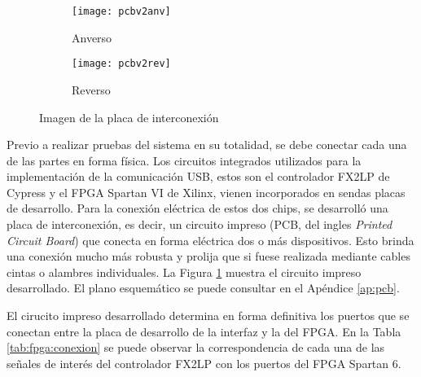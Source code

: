 \begin{figure}[ht]
	\centering
	\begin{subfigure}[t]{0.45\textwidth}
		\centering
		\texttt{[image: pcbv2anv]}
		\caption*{Anverso}
	\end{subfigure}
	\begin{subfigure}[t]{0.45\textwidth}
		\centering
		\texttt{[image: pcbv2rev]}
		\caption*{Reverso}
	\end{subfigure}
	\caption{Imagen de la placa de interconexión}
	\label{fpga:pcb:v2}
\end{figure}

Previo a realizar pruebas del sistema en su totalidad, se debe conectar cada una de las partes en forma física. Los circuitos integrados utilizados para la implementación de la comunicación USB, estos son el controlador FX2LP de Cypress y el FPGA Spartan VI de Xilinx, vienen incorporados en sendas placas de desarrollo. Para la conexión eléctrica de estos dos chips, se desarrolló una placa de interconexión, es decir, un circuito impreso (PCB, del ingles {\it Printed Circuit Board}) que conecta en forma eléctrica dos o más dispositivos. Esto brinda una conexión mucho más robusta y prolija que si fuese realizada mediante cables cintas o alambres individuales. La Figura \ref{fpga:pcb:v2} muestra el circuito impreso desarrollado. El plano esquemático se puede consultar en el Apéndice \ref{ap:pcb}.

El cirucito impreso desarrollado determina en forma definitiva los puertos que se conectan entre la placa de desarrollo de la interfaz y la del FPGA. En la Tabla \ref{tab:fpga:conexion} se puede observar la correspondencia de cada una de las señales de interés del controlador FX2LP con los puertos del FPGA Spartan 6.

